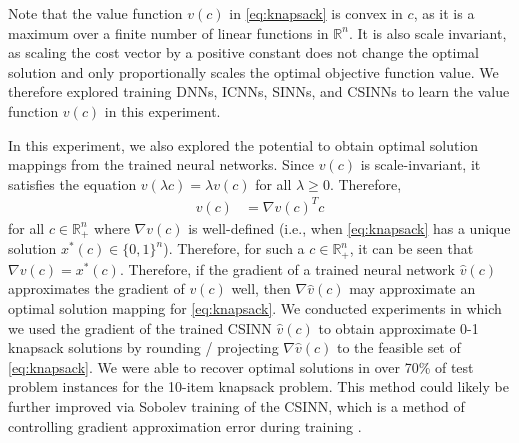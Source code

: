 \documentclass[10pt]{article} %
\theoremstyle{plain}
\theoremstyle{definition}
\theoremstyle{remark}
\begin{document}
Note that the value function $v(c)$ in \eqref{eq:knapsack} is convex in $c$, as it is a maximum over a finite number of linear functions in $\mathbb{R}^n$.
It is also scale invariant, as scaling the cost vector by a positive constant does not change the optimal solution and only proportionally scales the optimal objective function value.
We therefore explored training DNNs, ICNNs, SINNs, and CSINNs to learn the value function $v(c)$ in this experiment.

In this experiment, we also explored the potential to obtain optimal solution mappings from the trained neural networks. Since $v(c)$ is scale-invariant, it satisfies the equation $v(\lambda c) = \lambda v(c)$ for all $\lambda \geq 0$. Therefore,
\begin{align*}
v(c) &= \nabla v(c)^T c
\end{align*}
for all $c \in \mathbb{R}^n_+$ where $\nabla v(c)$ is well-defined (i.e., when \eqref{eq:knapsack} has a unique solution $x^*(c) \in \{0, 1\}^n$). Therefore, for such a $c \in \mathbb{R}^n_+$, it can be seen that $\nabla v(c) = x^*(c)$. Therefore, if the gradient of a trained neural network $\hat{v}(c)$ approximates the gradient of $v(c)$ well, then $\nabla \hat{v}(c)$ may approximate an optimal solution mapping for \eqref{eq:knapsack}. We conducted experiments in which we used the gradient of the trained CSINN $\hat{v}(c)$ to obtain approximate 0-1 knapsack solutions by rounding / projecting $\nabla \hat{v}(c)$ to the feasible set of \eqref{eq:knapsack}. We were able to recover optimal solutions in over 70\% of test problem instances for the 10-item knapsack problem. This method could likely be further improved via Sobolev training of the CSINN, which is a method of controlling gradient approximation error during training \citep{czarnecki2017sobolev}.
\end{document}

